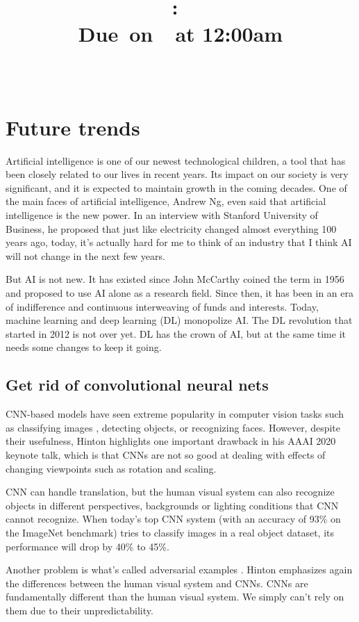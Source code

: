 \documentclass{article}
\title{
    \vspace{2in}
    \textmd{\textbf{\hmwkClass:\ \hmwkTitle}}\\
    \normalsize\vspace{0.1in}\small{Due\ on\ \hmwkDueDate\ at 12:00am}\\
    \vspace{0.1in}\large{\textit{\hmwkClassInstructor\ \hmwkClassTime}}
    \vspace{3in}
}
\author{\hmwkAuthorName}
\date{}
\begin{document}
\maketitle

\pagebreak

\section{Future trends}
Artificial intelligence is one of our newest technological children, a tool that has been closely related to our lives in recent years. Its impact on our society is very significant, and it is expected to maintain growth in the coming decades. One of the main faces of artificial intelligence, Andrew Ng, even said that artificial intelligence is the new power. In an interview with Stanford University of Business, he proposed that just like electricity changed almost everything 100 years ago, today, it's actually hard for me to think of an industry that I think AI will not change in the next few years.

But AI is not new. It has existed since John McCarthy \cite{31} coined the term in 1956 and proposed to use AI alone as a research field. Since then, it has been in an era of indifference and continuous interweaving of funds and interests. Today, machine learning and deep learning (DL) monopolize AI. The DL revolution that started in 2012 is not over yet. DL has the crown of AI, but at the same time it needs some changes to keep it going.

\subsection{Get rid of convolutional neural nets}
CNN-based models have seen extreme popularity in computer vision tasks such as classifying images \cite{32}, detecting objects, or recognizing faces. However, despite their usefulness, Hinton highlights one important drawback in his AAAI 2020 keynote talk, which is that CNNs are not so good at dealing with effects of changing viewpoints such as rotation and scaling.

CNN can handle translation, but the human visual system can also recognize objects in different perspectives, backgrounds or lighting conditions that CNN cannot recognize. When today's top CNN system (with an accuracy of 93\% on the ImageNet benchmark) tries to classify images in a real object dataset, its performance will drop by 40\% to 45\%.

Another problem is what’s called adversarial examples \cite{33}. Hinton emphasizes again the differences between the human visual system and CNNs.
CNNs are fundamentally different than the human visual system. We simply can’t rely on them due to their unpredictability.
\end{document}
